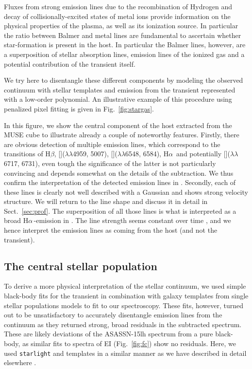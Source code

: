 \documentclass[traditabstract]{aa}
\newcommand{\hb}{H$\beta$}
\newcommand{\ha}{H$\alpha$}
\newcommand{\sii}{[\ion{S}{ii}]}
\newcommand{\oiii}{[\ion{O}{iii}]}
\newcommand{\nii}{[\ion{N}{ii}]}
\begin{document}
Fluxes from strong emission lines due to the recombination of Hydrogen and decay of collisionally-excited states of metal ions provide information on the physical properties of the plasma, as well as its ionization source. In particular the ratio between Balmer and metal lines are fundamental to ascertain whether star-formation is present in the host. In particular the Balmer lines, however, are a superposition of stellar absorption lines, emission lines of the ionized gas and a potential contribution of the transient itself. 

We try here to disentangle these different components by modeling the observed continuum with stellar templates and emission from the transient represented with a low-order polynomial. An illustrative example of this procedure using penalized pixel fitting \citep[pPXF,][]{2004PASP..116..138C, 2017MNRAS.466..798C} is given in Fig.~\ref{fig:stargas}.

In this figure, we show the central component of the host extracted from the MUSE cube to illustrate already a couple of noteworthy features. Firstly, there are obvious detection of multiple emission lines, which correspond to the transitions of \hb, \oiii($\lambda\lambda$4959, 5007), \nii($\lambda\lambda$6548, 6584), \ha\, and potentially \sii($\lambda\lambda$6717, 6731), even tough the significance of the latter is not particularly convincing and depends somewhat on the details of the subtraction. We thus confirm the interpretation of the detected emission lines in \citet{2017ApJ...836...25M}. Secondly, each of these lines is clearly not well described with a Gaussian and shows strong velocity structure. We will return to the line shape and discuss it in detail in Sect.~\ref{sec:prof}. The superposition of all those lines is what is interpreted as a broad \ha\,-emission in \citet{2016NatAs...1E...2L}. The line strength seems constant over time \citep{2016NatAs...1E...2L, 2017ApJ...836...25M}, and we hence interpret the emission lines as coming from the host (and not the transient).

\subsection{The central stellar population}
\label{sec:spop}

To derive a more physical interpretation of the stellar continuum, we used simple black-body fits for the transient in combination with galaxy templates from single stellar populations models to fit to our spectroscopy. These fits, however, turned out to be unsatisfactory to accurately disentangle emission lines from the continuum as they returned strong, broad residuals in the subtracted spectrum. These are likely deviations of the ASASSN-15lh spectrum from a pure black-body, as similar fits to spectra of EI (Fig.~\ref{fig:fc}) show no residuals. Here, we used \texttt{starlight} \citep{2005MNRAS.358..363C, 2009RMxAC..35..127C} and \citet{2003MNRAS.344.1000B} templates in a similar manner as we have described in detail elsewhere \citep{2016MNRAS.455.4087G, 2017arXiv170205430K}.
\end{document}
